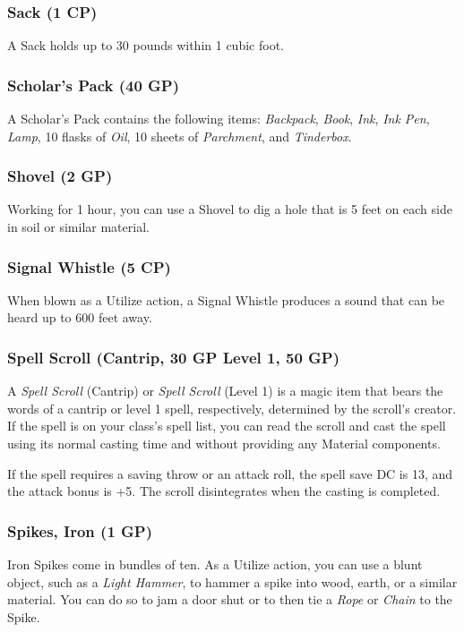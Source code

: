 \documentclass[10pt,a4paper,twoside,bg=print,twocolumn,openany,nodeprecatedcode]{dndbook}
\begin{document}
\subsubsection{Sack (1 CP)}
A Sack holds up to 30 pounds within 1 cubic foot.

\subsubsection{Scholar's Pack (40 GP)}
A Scholar's Pack contains the following items: \textit{Backpack}, \textit{Book}, \textit{Ink}, \textit{Ink Pen}, \textit{Lamp}, 10 flasks of \textit{Oil}, 10 sheets of \textit{Parchment}, and \textit{Tinderbox}.

\subsubsection{Shovel (2 GP)}
Working for 1 hour, you can use a Shovel to dig a hole that is 5 feet on each side in soil or similar material.

\subsubsection{Signal Whistle (5 CP)}
When blown as a Utilize action, a Signal Whistle produces a sound that can be heard up to 600 feet away.

\subsubsection{Spell Scroll (Cantrip, 30 GP Level 1, 50 GP)}
A \textit{Spell Scroll} (Cantrip) or \textit{Spell Scroll} (Level 1) is a magic item that bears the words of a cantrip or level 1 spell, respectively, determined by the scroll's creator. If the spell is on your class's spell list, you can read the scroll and cast the spell using its normal casting time and without providing any Material components.

If the spell requires a saving throw or an attack roll, the spell save DC is 13, and the attack bonus is +5. The scroll disintegrates when the casting is completed.

\subsubsection{Spikes, Iron (1 GP)}
Iron Spikes come in bundles of ten. As a Utilize action, you can use a blunt object, such as a \textit{Light Hammer}, to hammer a spike into wood, earth, or a similar material. You can do so to jam a door shut or to then tie a \textit{Rope} or \textit{Chain} to the Spike.
\end{document}
